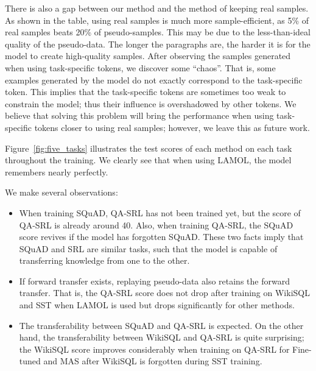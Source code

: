\documentclass{article} %
\begin{document}
There is also a gap between our method and the method of keeping real samples.
As shown in the table, using real samples is much more sample-efficient, as 5\% of real samples beats 20\% of pseudo-samples.
This may be due to the less-than-ideal quality of the pseudo-data.
The longer the paragraphs are, the harder it is for the model to create high-quality samples.
After observing the samples generated when using task-specific tokens, we discover some ``chaos''.
That is, some examples generated by the model do not exactly correspond to the task-specific token.
This implies that the task-specific tokens are sometimes too weak to constrain the model; thus their influence is overshadowed by other tokens.
We believe that solving this problem will bring the performance when using task-specific tokens closer to using real samples; however, we leave this as future work. 

Figure~\ref{fig:five_tasks} illustrates the test scores of each method on each task throughout the training.
We clearly see that when using LAMOL, the model remembers nearly perfectly.

We make several observations:
\begin{itemize}
    \item When training SQuAD, QA-SRL has not been trained yet, but the score of QA-SRL is already around 40.
    Also, when training QA-SRL, the SQuAD score revives if the model has forgotten SQuAD.
    These two facts imply that SQuAD and SRL are similar tasks, such that the model is capable of transferring knowledge from one to the other.
    \item If forward transfer exists, replaying pseudo-data also retains the forward transfer. That is, the QA-SRL score does not drop after training on WikiSQL and SST when LAMOL is used but drops significantly for other methods.
    \item The transferability between SQuAD and QA-SRL is expected. 
On the other hand, the transferability between WikiSQL and QA-SRL is quite surprising; the WikiSQL score improves considerably when training on QA-SRL for Fine-tuned and MAS after WikiSQL is forgotten during SST training. 
\end{itemize}

\end{document}
